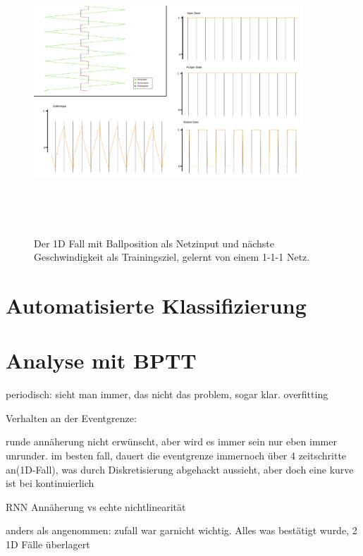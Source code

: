 \begin{figure}
	\centering
	\includegraphics[width=0.9\textwidth, height=400px]{pics/act1.png}	
	\caption{Der 1D Fall mit Ballposition als Netzinput und nächste Geschwindigkeit als Trainingsziel, gelernt von einem 1-1-1 Netz.  }
	\label{img:act1}
\end{figure}


\cite{bib:graves}

\section{Automatisierte Klassifizierung}




\section{Analyse mit BPTT}

periodisch: sieht man immer, das nicht das problem, sogar klar. overfitting

Verhalten an der Eventgrenze:

runde annäherung nicht erwünscht, aber wird es immer sein nur eben immer unrunder. im besten fall, dauert die eventgrenze immernoch über 4 zeitschritte an(1D-Fall), was durch Diskretisierung abgehackt aussieht, aber doch eine kurve ist bei kontinuierlich




RNN Annäherung vs echte nichtlinearität

anders als angenommen: zufall war garnicht wichtig. Alles was bestätigt wurde, 2 1D Fälle überlagert

